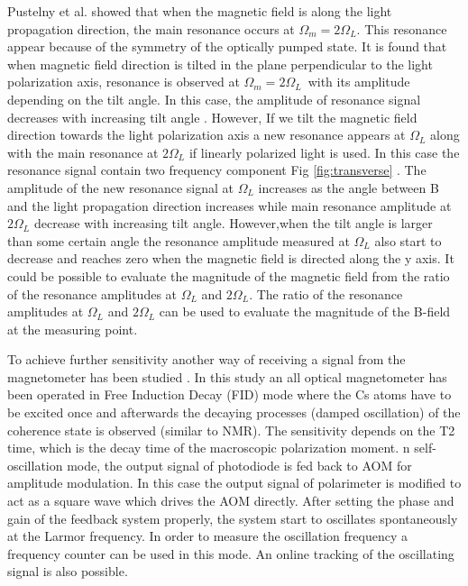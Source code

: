Pustelny et al. \cite{PhysRevA.74.063420}  showed that when the magnetic field is along the light propagation direction, the main resonance occurs at $\Omega_m = 2\Omega_L$. This resonance appear because of the symmetry of the optically pumped state. It is found that when magnetic field direction is tilted in the plane perpendicular to the light polarization axis, resonance is observed at  $\Omega_m = 2\Omega_L$~with its amplitude depending on the tilt angle. In this case, the amplitude of resonance signal decreases with increasing tilt angle . However, If we tilt the magnetic field direction towards the light polarization axis a new resonance appears at $\Omega_L$ along with the main resonance at $2\Omega_L$ if linearly polarized light is used. In this case the resonance signal contain two frequency component Fig \ref{fig:transverse} . The amplitude of the new resonance signal at $\Omega_L$  increases as the angle between B and the light propagation direction increases while main resonance amplitude at $2\Omega_L$  decrease with increasing tilt angle. However,when the tilt angle is larger than some certain angle the resonance amplitude measured at $\Omega_L$ also start to decrease and reaches zero when the magnetic field is directed along the y axis.   It could be possible to evaluate the magnitude of the magnetic field from the ratio of the resonance amplitudes at $\Omega_L$ and $2\Omega_L$. The ratio of the resonance amplitudes at $\Omega_L$ and $2\Omega_L$ can be used to
evaluate the magnitude of the B-field at the measuring point.

 To achieve further sensitivity another way of receiving a signal from the magnetometer
has been studied \cite{mythesis}. In this study an all optical magnetometer has been operated in Free Induction Decay (FID) mode where the Cs atoms have to be excited
once and afterwards the decaying processes (damped oscillation) of the coherence state is
observed (similar to NMR). The sensitivity depends on the T2 time, which is the decay time
of the macroscopic polarization moment.
n self-oscillation mode\cite{PhysRevA.62.043403}, the output signal
of photodiode is fed back to AOM for amplitude modulation. In this
case the output signal of polarimeter is modified to act as a square
wave which drives the AOM directly. After setting the phase and gain
of the feedback system properly, the system start to oscillates
spontaneously at the Larmor frequency. In order to measure the
oscillation frequency a frequency counter can be used in this mode. An
online tracking of the oscillating signal is also possible.

